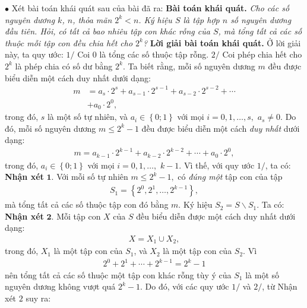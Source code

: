 \begin{multicols}{2}
	\vskip 0.05cm
	$\bullet$ Xét bài toán khái quát sau của bài đã ra:
	\vskip 0.05cm
	\textbf{\color{thachthuctoanhoc}Bài toán khái quát.} \textit{Cho các số nguyên dương $k$, $n$, thỏa mãn $2^k < n$. Ký hiệu $S$ là tập hợp $n$ số nguyên dương đầu tiên. Hỏi, có tất cả bao nhiêu tập con khác rỗng của $S$, mà tổng tất cả các số thuộc mỗi tập con đều chia hết cho  $2^k$?}
	\vskip 0.05cm
	\textbf{\color{thachthuctoanhoc}Lời giải bài toán khái quát.}
	\vskip 0.05cm
	Ở lời giải này, ta quy ước:
	\vskip 0.05cm
	$1/$ Coi $0$ là tổng các số thuộc tập rỗng.
	\vskip 0.05cm
	$2/$ Coi phép chia hết cho $2^k$  là phép chia có số dư bằng  $2^k$.
	\vskip 0.05cm
	Ta biết rằng, mỗi số nguyên dương $m$ đều được biểu diễn một cách duy nhất dưới dạng:
	\begin{align*}
		m &= {a_s} \cdot {2^s} + {a_{s - 1}} \cdot {2^{s - 1}} + {a_{s - 2}} \cdot {2^{s - 2}} +  \cdots  \\
		&+ {a_0} \cdot {2^0},
	\end{align*}
	trong đó, $s$ là một số tự nhiên, và  ${a_i} \in \left\{ {0;1} \right\}$ với mọi  $i = 0,1, \ldots ,s, $ ${a_s} \ne 0.$
	\vskip 0.05cm  
	Do đó, mỗi số nguyên dương  $m \le {2^k} - 1$ đều được biểu diễn một cách \textit{duy nhất} dưới dạng:
	\begin{align*}
		m = {a_{k - 1}} \cdot {2^{k - 1}} + {a_{k - 2}} \cdot {2^{k - 2}} +  \cdots  + {a_0} \cdot {2^0},
	\end{align*}
	trong đó, ${a_i} \in \left\{ {0;1} \right\}$  với mọi  $i = 0,1, \ldots,$ $k - 1$.
	\vskip 0.05cm
	Vì thế, với quy ước $1/$, ta có:
	\vskip 0.05cm
	\textbf{\color{thachthuctoanhoc}Nhận xét} $\pmb{1.}$ Với mỗi số tự nhiên $m \le {2^k} - 1,$  có \textit{đúng một} tập con của tập
	\begin{align*}
		{S_1} = \left\{ {{2^0},{2^1}, \ldots ,{2^{k - 1}}} \right\},
	\end{align*}
	mà tổng tất cả các số thuộc tập con đó bằng  $m$.
	\vskip 0.05cm
	Ký hiệu ${S_2} = S \backslash {S_1}$.  Ta có:
	\vskip 0.05cm
	\textbf{\color{thachthuctoanhoc}Nhận xét} $\pmb{2.}$ Mỗi tập con $X$ của $S$ đều biểu diễn được một cách duy nhất dưới dạng:
	\begin{align*}
		X = {X_1} \cup {X_2},
	\end{align*}
	trong đó, $X_1$  là một tập con của  $S_1$, và $X_2$  là một tập con của $S_2$.
	\vskip 0.05cm 
	Vì
	\begin{align*}
		{2^0} + {2^1} +  \cdots  + {2^{k - 1}} = {2^k} - 1
	\end{align*}
	nên tổng tất cả các số thuộc một tập con khác rỗng tùy ý của $S_1$  là một số nguyên dương không vượt quá $2^k -1$.  Do đó, với các quy ước $1/$ và $2/$, từ Nhận xét $2$ suy ra:

\end{multicols}
